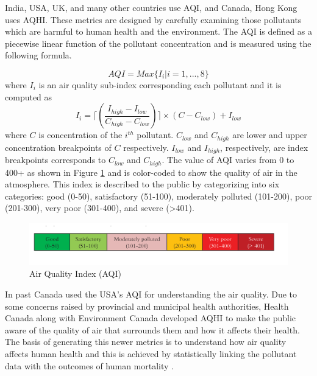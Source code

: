 India, USA, UK, and many other countries use AQI, and Canada, Hong Kong uses AQHI. These metrics are designed by carefully examining those pollutants which are harmful to human health and the environment.
The AQI is defined as a piecewise linear function of the pollutant concentration \cite{Soni2016} and is measured using the following formula.

\begin{equation}
AQI = Max \{I_i|i = 1, ..., 8\}
\end{equation}
where $I_i$ is an air quality sub-index corresponding each pollutant and it is computed as 
\begin{equation}
I_i = \lceil(\frac{I_{high} - I_{low}}{C_{high} - C_{low}})\rceil \times (C - C_{low}) + I_{low}
\end{equation}
where $C$ is concentration of the $i^{th}$ pollutant. $C_{low}$ and $C_{high}$ are lower and upper concentration breakpoints of $C$ respectively.
$I_{low}$ and $I_{high}$, respectively, are index breakpoints corresponds to $C_{low}$ and $C_{high}$.  The value of AQI varies from 0 to 400+ as shown in Figure \ref{aqi} and is color-coded to show the quality of air in the atmosphere. This index is described to the public by categorizing into six categories: good (0-50), satisfactory (51-100), moderately polluted (101-200), poor (201-300), very poor (301-400), and severe (>401).


\begin{figure}[h]
    \begin{center}
    \includegraphics[scale=0.58]{./images/figure13.png}
    \end{center}
   
    \caption{Air Quality Index (AQI) \cite{AirQualityIndex}}
    
    \label{aqi}
\end{figure}

\hspace{1 cm}

In past Canada used the USA's AQI for understanding the air quality. Due to some concerns raised by provincial and municipal health authorities, Health Canada along with Environment Canada developed AQHI to make the public aware of the quality of air that surrounds them and how it affects their health. The basis of generating this newer metrics is to understand how air quality affects human health and this is achieved by statistically linking the pollutant data with the outcomes of human mortality \cite{hasselback2010air}.

